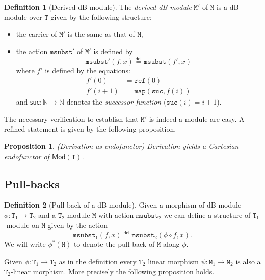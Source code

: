 \documentclass[a4paper,twoside,12pt]{article}
\newtheorem{proposition}{Proposition}
\theoremstyle{definition}
\newtheorem{definition}{Definition}
\theoremstyle{remark}
\theoremstyle{example}
\newcommand{\NN}{\mathbb{N}}
\newcommand{\TT}{\mathtt{T}}
\newcommand{\MM}{\mathtt{M}}
\newcommand{\refe}{\mathtt{ref}}
\newcommand{\map}{\mathtt{map}}
\newcommand{\msubst}{\mathtt{msubst}}
\begin{document}
\begin{definition}[Derived dB-module]
  The \emph{derived dB-module} $\MM'$ of $\MM$ is a dB-module over
  $\TT$ given by the following structure:
  \begin{itemize}
  \item the carrier of $\MM'$ is the same as that of $\MM$,
  \item the action $\msubst'$ of $\MM'$ is defined by
    \begin{equation*}
    \msubst'(f,x) \stackrel{\mathsf{def}}{=} \msubst(f',x)
  \end{equation*}
  where $f'$ is defined by the equations:
  \begin{align*}
    f'(0) &= \refe(0)\\
    f'(i+1) &= \map(\mathtt{suc},f(i))
  \end{align*}
  and $\mathsf{suc} \colon \NN \to \NN$ denotes the \emph{successor
    function} ($\mathtt{suc}(i) = i+1$).
  \end{itemize}
\end{definition}

The necessary verification to establish that $\MM'$ is indeed a module
are easy.  A refined statement is given by the following proposition.

\begin{proposition}(Derivation as endofunctor)
  \label{prop:derivation-endo}
  Derivation yields a Cartesian endofunctor of $\mathsf{Mod}(\TT)$.
\end{proposition}

\subsection{Pull-backs}
\label{sec:pull-backs}

\begin{definition}[Pull-back of a dB-module]
  Given a morphism of dB-module $\phi\colon \TT_1 \to \TT_2$ and a
  $\TT_2$ module $\MM$ with action $\msubst_2$ we can define a
  structure of $\TT_1$-module on $\MM$ given by the action
  \begin{equation*}
    \msubst_1(f,x) \stackrel{\mathsf{def}}{=} \msubst_2(\phi \circ f, x).
  \end{equation*}
  We will write $\phi^*(\MM)$ to denote the pull-back of $\MM$ along
  $\phi$.
\end{definition}

Given $\phi\colon \TT_1 \to \TT_2$ as in the definition every $\TT_2$
linear morphism $\psi\colon \MM_1 \to \MM_2$ is also a $\TT_2$-linear
morphism.  More precisely the following proposition holds.
\end{document}
